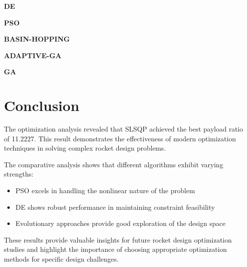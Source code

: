 \documentclass[11pt]{article}
\begin{document}
\item \textbf{DE}
\begin{itemize}
\end{itemize}
\item \textbf{PSO}
\begin{itemize}
\end{itemize}
\item \textbf{BASIN-HOPPING}
\begin{itemize}
\end{itemize}
\item \textbf{ADAPTIVE-GA}
\begin{itemize}
\end{itemize}
\item \textbf{GA}
\begin{itemize}
\end{itemize}

\section{Conclusion}
The optimization analysis revealed that SLSQP achieved the best payload ratio of 11.2227. This result demonstrates the effectiveness of modern optimization techniques in solving complex rocket design problems.

The comparative analysis shows that different algorithms exhibit varying strengths:
\begin{itemize}
    \item PSO excels in handling the nonlinear nature of the problem \cite{pso_ascent_2013}
    \item DE shows robust performance in maintaining constraint feasibility \cite{de_ascent_2021}
    \item Evolutionary approaches provide good exploration of the design space \cite{evolutionary_rocket_2022}
\end{itemize}

These results provide valuable insights for future rocket design optimization studies and highlight the importance of choosing appropriate optimization methods for specific design challenges.


\end{document}
